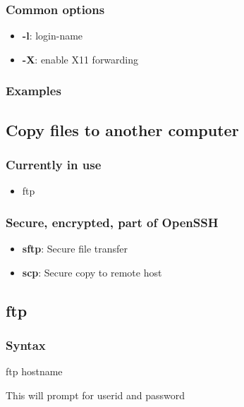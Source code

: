 \documentclass{report}
\begin{document}
    \bigbreak \noindent 
    \subsubsection{Common options}
    \bigbreak \noindent 
    \begin{itemize}
        \item \textbf{-l}: login-name 
        \item \textbf{-X}: enable X11 forwarding
    \end{itemize}

    \bigbreak \noindent 
    \subsubsection{Examples}
    \bigbreak \noindent 

    \pagebreak 
    \subsection{Copy files to another computer}

    \bigbreak \noindent 
    \subsubsection{Currently in use}
    \begin{itemize}
        \item ftp
    \end{itemize}

    \bigbreak \noindent 
    \subsubsection{Secure, encrypted, part of OpenSSH}
    \bigbreak \noindent 
    \begin{itemize}
        \item \textbf{sftp}: Secure file transfer
        \item \textbf{scp}: Secure copy to remote host
    \end{itemize}

    \bigbreak \noindent 
    \subsection{ftp}
    \bigbreak \noindent 
    \subsubsection{Syntax}
    \bigbreak \noindent 
    \begin{bashcode}
        ftp hostname
    \end{bashcode}
    \bigbreak \noindent 
    This will prompt for userid and password
\end{document}
